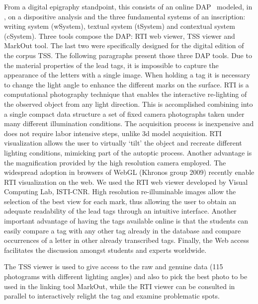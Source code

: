 \documentclass[amsthm,ebook]{saparticle}
\begin{document}
From a digital epigraphy standpoint, this consists of an online DAP \ modeled, in \citet{Lame2015}, on a dispositive analysis
and the three fundamental systems of an inscription: writing system (wSystem), textual system (tSystem) and contextual
system (cSystem). Three tools compose the DAP: RTI web viewer, TSS viewer and MarkOut tool. The last two were
specifically designed for the digital edition of the corpus TSS. The following paragraphs present those three DAP
tools. Due to the material properties of the lead tags, it is impossible to capture the appearance of the letters with
a single image. When holding a tag it is necessary to change the light angle to enhance the different marks on the
surface. RTI is a computational photography technique that enables the interactive re-lighting of the observed object
from any light direction. This is accomplished combining into a single compact data structure a set of fixed camera
photographs taken under many different illumination conditions. The acquisition process is inexpensive and does not
require labor intensive steps, unlike 3d model acquisition. RTI visualization allows the user to virtually ‘tilt’ the
object and recreate different lighting conditions, mimicking part of the autoptic process. Another advantage is the
magnification provided by the high resolution camera employed. The widespread adoption in browsers of WebGL (Khronos
group 2009) recently enable RTI visualization on the web. We used the RTI web viewer developed by Visual Computing Lab,
ISTI-CNR. High resolution re-illuminable images allow the selection of the best view for each mark, thus allowing the
user to obtain an adequate readability of the lead tags through an intuitive interface. Another important advantage of
having the tags available online is that the students can easily compare a tag with any other tag already in the
database and compare occurrences of a letter in other already transcribed tags. Finally, the Web access facilitates the
discussion amongst students and experts worldwide.

The TSS viewer is used to give access to the raw and genuine data (115 photograms with different lighting angles) and
also to pick the best photo to be used in the linking tool MarkOut, while the RTI viewer can be consulted in parallel
to interactively relight the tag and examine problematic spots.
\end{document}
